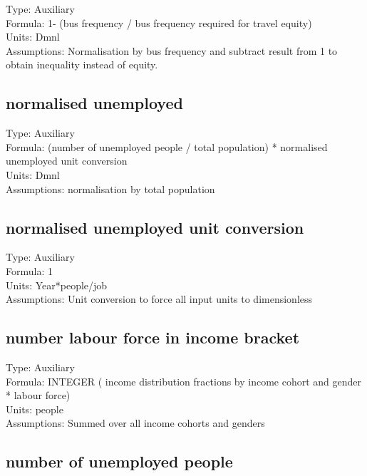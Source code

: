 \documentclass[
  11pt,
]{book}
\begin{document}
Type: Auxiliary\\
Formula: 1- (bus frequency / bus frequency required for travel equity)\\
Units: Dmnl\\
Assumptions: Normalisation by bus frequency and subtract result from 1 to obtain inequality instead of equity.

\hypertarget{normalised-unemployed}{%
\subsection{normalised unemployed}\label{normalised-unemployed}}

Type: Auxiliary\\
Formula: (number of unemployed people / total population) * normalised unemployed unit conversion\\
Units: Dmnl\\
Assumptions: normalisation by total population

\hypertarget{normalised-unemployed-unit-conversion}{%
\subsection{normalised unemployed unit conversion}\label{normalised-unemployed-unit-conversion}}

Type: Auxiliary\\
Formula: 1\\
Units: Year*people/job\\
Assumptions: Unit conversion to force all input units to dimensionless

\hypertarget{number-labour-force-in-income-bracket}{%
\subsection{number labour force in income bracket}\label{number-labour-force-in-income-bracket}}

Type: Auxiliary\\
Formula: INTEGER ( income distribution fractions by income cohort and gender * labour force)\\
Units: people\\
Assumptions: Summed over all income cohorts and genders

\hypertarget{number-of-unemployed-people}{%
\subsection{number of unemployed people}\label{number-of-unemployed-people}}
\end{document}
